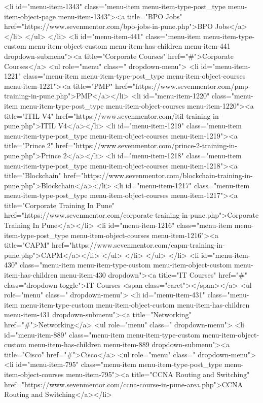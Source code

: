 {<li id="menu-item-1343" class="menu-item menu-item-type-post_type menu-item-object-page menu-item-1343"><a title="BPO Jobs" href="https://www.sevenmentor.com/bpo-jobs-in-pune.php">BPO Jobs</a></li>
</ul>
</li>
<li id="menu-item-441" class="menu-item menu-item-type-custom menu-item-object-custom menu-item-has-children menu-item-441 dropdown-submenu"><a title="Corporate Courses" href="#">Corporate Courses</a>
<ul role="menu" class=" dropdown-menu">
<li id="menu-item-1221" class="menu-item menu-item-type-post_type menu-item-object-courses menu-item-1221"><a title="PMP" href="https://www.sevenmentor.com/pmp-training-in-pune.php">PMP</a></li>
<li id="menu-item-1220" class="menu-item menu-item-type-post_type menu-item-object-courses menu-item-1220"><a title="ITIL V4" href="https://www.sevenmentor.com/itil-training-in-pune.php">ITIL V4</a></li>
<li id="menu-item-1219" class="menu-item menu-item-type-post_type menu-item-object-courses menu-item-1219"><a title="Prince 2" href="https://www.sevenmentor.com/prince-2-training-in-pune.php">Prince 2</a></li>
<li id="menu-item-1218" class="menu-item menu-item-type-post_type menu-item-object-courses menu-item-1218"><a title="Blockchain" href="https://www.sevenmentor.com/blockchain-training-in-pune.php">Blockchain</a></li>
<li id="menu-item-1217" class="menu-item menu-item-type-post_type menu-item-object-courses menu-item-1217"><a title="Corporate Training In Pune" href="https://www.sevenmentor.com/corporate-training-in-pune.php">Corporate Training In Pune</a></li>
<li id="menu-item-1216" class="menu-item menu-item-type-post_type menu-item-object-courses menu-item-1216"><a title="CAPM" href="https://www.sevenmentor.com/capm-training-in-pune.php">CAPM</a></li>
</ul>
</li>
</ul>
</li>
<li id="menu-item-430" class="menu-item menu-item-type-custom menu-item-object-custom menu-item-has-children menu-item-430 dropdown"><a title="IT Courses" href="#" class="dropdown-toggle">IT Courses <span class="caret"></span></a>
<ul role="menu" class=" dropdown-menu">
<li id="menu-item-431" class="menu-item menu-item-type-custom menu-item-object-custom menu-item-has-children menu-item-431 dropdown-submenu"><a title="Networking" href="#">Networking</a>
<ul role="menu" class=" dropdown-menu">
<li id="menu-item-889" class="menu-item menu-item-type-custom menu-item-object-custom menu-item-has-children menu-item-889 dropdown-submenu"><a title="Cisco" href="#">Cisco</a>
<ul role="menu" class=" dropdown-menu">
<li id="menu-item-795" class="menu-item menu-item-type-post_type menu-item-object-courses menu-item-795"><a title="CCNA Routing and Switching" href="https://www.sevenmentor.com/ccna-course-in-pune-area.php">CCNA Routing and Switching</a></li>
}
